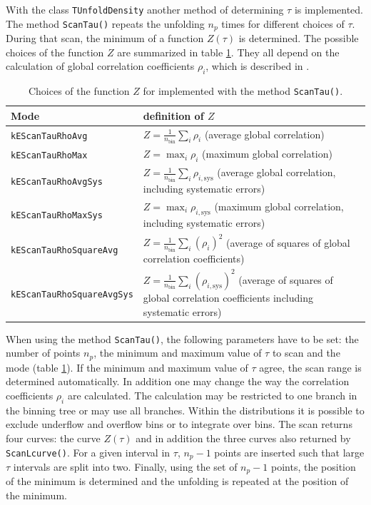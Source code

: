 \documentclass[12pt]{article}
\begin{document}
With the class {\tt TUnfoldDensity} another method of determining
$\tau$ is implemented. The method {\tt ScanTau()} repeats the unfolding $n_p$ times
for different choices of $\tau$. During that scan, the minimum of a
function $Z(\tau)$ is determined. The possible choices of the function
$Z$ are summarized in table \ref{tab:choiceOfZ}. They all depend on
the calculation of global correlation coefficients $\rho_i$, which is described in
\cite{Schmitt:2012kp}.
\begin{table}[ht]
\centering
\begin{tabular}{l|p{}}
Mode & definition of $Z$ \\
\hline
\hline
{\tt kEScanTauRhoAvg} & $Z=\frac{1}{n_{\text{bin}}}\sum_i \rho_i$
(average global correlation) \\
\hline
{\tt kEScanTauRhoMax} & $Z=\max_i \rho_i$
(maximum global correlation) \\
\hline
{\tt kEScanTauRhoAvgSys} & $Z=\frac{1}{n_{\text{bin}}}\sum_i \rho_{i,\text{sys}}$
(average global correlation, including systematic errors) \\
\hline
{\tt kEScanTauRhoMaxSys} &  $Z=\max_i \rho_{i,\text{sys}}$
(maximum global correlation, including systematic errors)\\
\hline
{\tt kEScanTauRhoSquareAvg} & $Z=\frac{1}{n_{\text{bin}}}\sum_i
(\rho_i)^2$
(average of squares of global correlation coefficients)\\
\hline
{\tt kEScanTauRhoSquareAvgSys} & 
$Z=\frac{1}{n_{\text{bin}}}\sum_i
(\rho_{i,\text{sys}})^2$ (average of squares of global correlation
coefficients including systematic errors)
\end{tabular}
\caption{\label{tab:choiceOfZ}Choices of the function $Z$ for
  implemented with the method {\tt ScanTau()}.}
\end{table}
When using the method {\tt ScanTau()}, the following parameters have
to be set: the number of points $n_p$, the  minimum and maximum value of $\tau$ to scan and
the mode (table \ref{tab:choiceOfZ}). If the minimum and maximum value
of $\tau$ agree, the scan range is determined automatically.
In addition one may change the
way the correlation coefficients $\rho_i$ are calculated. The
calculation may be restricted to one branch in the binning tree or may
use all branches. Within the distributions it is possible to exclude
underflow and overflow bins or to integrate over bins.
The scan returns four curves:
the curve $Z(\tau)$ and in addition the three curves also returned by
{\tt ScanLcurve()}.
For a given interval in $\tau$, $n_p-1$ points are inserted such that
large $\tau$ intervals are split into two.
Finally, using the set of $n_p-1$ points,
the position of the minimum is determined and the unfolding is
repeated at the position of the minimum.
\end{document}
